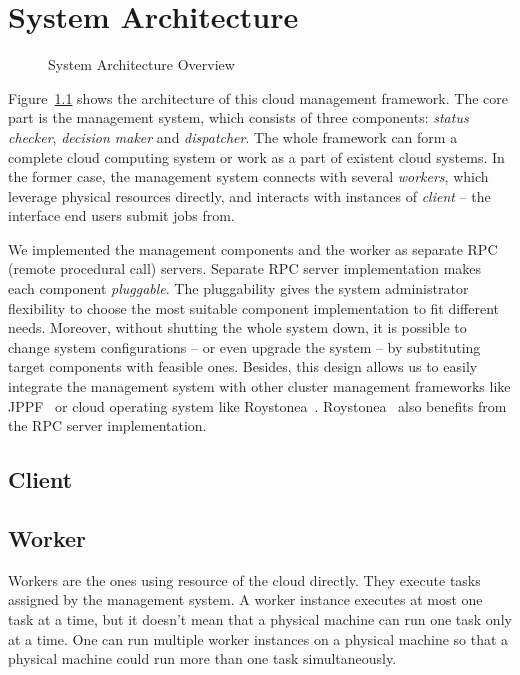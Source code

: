 \chapter{System Architecture}

\begin{figure}
  \centering
  
  \caption{System Architecture Overview}
  \label{fig:archi-overview}
\end{figure}


Figure~\ref{fig:archi-overview} shows the architecture of this cloud
management framework.  The core part is the management system, which
consists of three components: \emph{status checker}, \emph{decision
maker} and \emph{dispatcher}.  The whole framework can form a complete
cloud computing system or work as a part of existent cloud systems.  In
the former case, the management system connects with several
\emph{workers}, which leverage physical resources directly, and
interacts with instances of \emph{client} -- the interface end users
submit jobs from.

We implemented the management components and the worker as separate RPC
(remote procedural call) servers.  Separate RPC server implementation
makes each component \emph{pluggable}.  The pluggability gives the
system administrator flexibility to choose the most suitable component
implementation to fit different needs.  Moreover, without shutting the
whole system down, it is possible to change system configurations -- or
even upgrade the system -- by substituting target components with
feasible ones.  Besides, this design allows us to easily integrate the
management system with other cluster management frameworks like
JPPF~\cite{cite:JPPF} or cloud operating system like
Roystonea~\cite{cite:roystonea}.  Roystonea~\cite{cite:roystonea} also
benefits from the RPC server implementation.

\section{Client}

\section{Worker}

Workers are the ones using resource of the cloud directly.  They execute
tasks assigned by the management system.  A worker instance executes at
most one task at a time, but it doesn't mean that a physical machine can
run one task only at a time.  One can run multiple worker instances on a
physical machine so that a physical machine could run more than one task
simultaneously.	 

